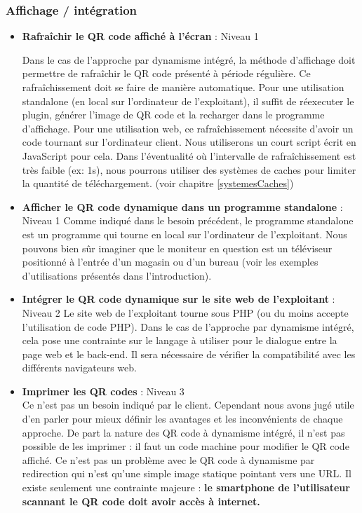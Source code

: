 \documentclass[a4paper,12pt]{article}
\begin{document}
\subsubsection{Affichage / intégration}
\begin{itemize}
  
  \item \textbf{Rafraîchir le QR code affiché à l'écran} : Niveau 1
  
  Dans le cas de l'approche par dynamisme intégré, la méthode d'affichage doit permettre de rafraîchir le QR code présenté à période régulière. Ce rafraîchissement doit se faire de manière automatique. Pour une utilisation standalone (en local sur l'ordinateur de l'exploitant), il suffit de réexecuter le plugin, générer l'image de QR code et la recharger dans le programme d'affichage. Pour une utilisation web, ce rafraîchissement nécessite d'avoir un code tournant sur l'ordinateur client. Nous utiliserons un court script écrit en JavaScript pour cela. Dans l'éventualité où l'intervalle de rafraîchissement est très faible (ex: 1s), nous pourrons utiliser des systèmes de caches pour limiter la quantité de téléchargement. (voir chapitre \ref{systemesCaches})\\[0.5cm]
  
 
  \item \textbf{Afficher le QR code dynamique dans un programme standalone} : Niveau 1
  Comme indiqué dans le besoin précédent, le programme standalone est un programme qui tourne en local sur l'ordinateur de l'exploitant. Nous pouvons bien sûr imaginer que le moniteur en question est un téléviseur positionné à l'entrée d'un magasin ou d'un bureau (voir les exemples d'utilisations présentés dans l'introduction).\\
  \item \textbf{Intégrer le QR code dynamique sur le site web de l'exploitant} : Niveau 2
  Le site web de l'exploitant tourne sous PHP (ou du moins accepte l'utilisation de code PHP). Dans le cas de l'approche par dynamisme intégré, cela pose une contrainte sur le langage à utiliser pour le dialogue entre la page web et le back-end. Il sera nécessaire de vérifier la compatibilité avec les différents navigateurs web.\\
  \item \textbf{Imprimer les QR codes} : Niveau 3\\
  Ce n'est pas un besoin indiqué par le client. Cependant nous avons jugé utile d'en parler pour mieux définir les avantages et les inconvénients de chaque approche. De part la nature des QR code à dynamisme intégré, il n'est pas possible de les imprimer : il faut un code machine pour modifier le QR code affiché. Ce n'est pas un problème avec le QR code à dynamisme par redirection qui n'est qu'une simple image statique pointant vers une URL. Il existe seulement une contrainte majeure : \textbf{le smartphone de l'utilisateur scannant le QR code doit avoir accès à internet.}\\
  

\end{itemize}
\end{document}
